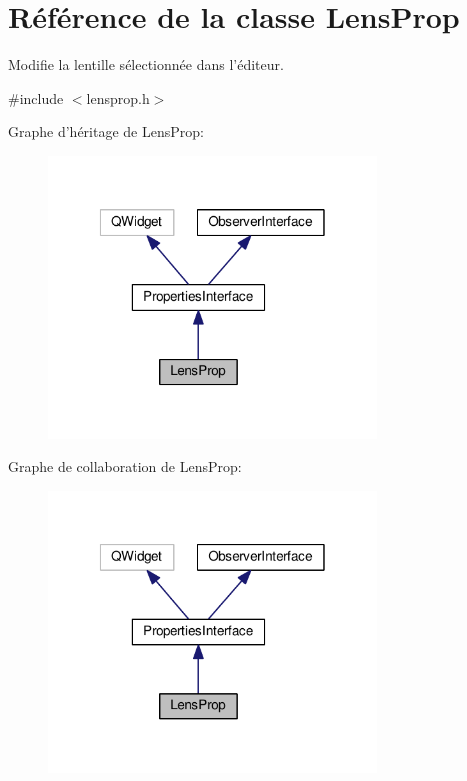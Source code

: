 \hypertarget{classLensProp}{\section{Référence de la classe Lens\+Prop}
\label{classLensProp}
}


Modifie la lentille sélectionnée dans l’éditeur.  




{\ttfamily \#include $<$lensprop.\+h$>$}



Graphe d'héritage de Lens\+Prop\+:\nopagebreak
\begin{figure}[H]
\begin{center}
\leavevmode
\includegraphics[width=247pt]{d8/d9c/classLensProp__inherit__graph}
\end{center}
\end{figure}


Graphe de collaboration de Lens\+Prop\+:\nopagebreak
\begin{figure}[H]
\begin{center}
\leavevmode
\includegraphics[width=247pt]{de/d14/classLensProp__coll__graph}
\end{center}
\end{figure}
